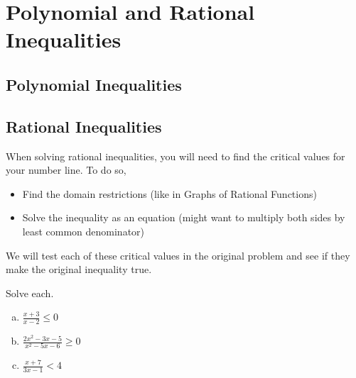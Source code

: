 \chapter{Polynomial and Rational Inequalities}

\section{Polynomial Inequalities}

\section{Rational Inequalities}

When solving rational inequalities, you will need to find the critical values for your number line. To do so,

\begin{itemize}
    \item Find the domain restrictions (like in Graphs of Rational Functions)
    \item Solve the inequality as an equation (might want to multiply both sides by least common denominator)
\end{itemize}

We will test each of these critical values in the original problem and see if they make the original inequality true. \newline 

\begin{example}
Solve each.
\begin{multicols}{3}
\begin{enumerate}[(a)]
    \item $\frac{x+3}{x-2} \leq 0$
    \item $\frac{2x^2 - 3x - 5}{x^2 - 5x - 6} \geq 0$
    \item $\frac{x+7}{3x-1} < 4$
\end{enumerate}
\end{multicols}
\end{example}

